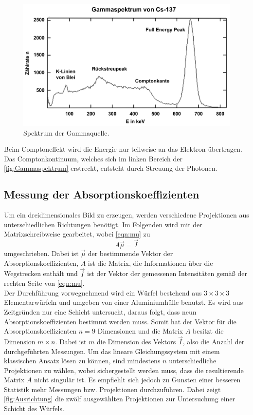 \begin{figure}[H]
    \centering
    \includegraphics[scale=0.7]{Abbildungen/Gammaspektrum.png}
    \caption{Spektrum der Gammaquelle.\cite{Gammaspektrum}}
    \label{fig:Gammaspektrum}
\end{figure}

Beim Comptoneffekt wird die Energie nur teilweise an das Elektron übertragen. Das Comptonkontinuum, welches sich im linken Bereich der
\autoref{fig:Gammaspektrum} erstreckt, entsteht durch Streuung der Photonen.

\subsection{Messung der Absorptionskoeffizienten}
\label{subsec:Absorptionskoeffizient}
Um ein dreidimensionales Bild zu erzeugen, werden verschiedene Projektionen aus unterschiedlichen Richtungen benötigt. Im Folgenden wird mit der Matrixschreibweise gearbeitet, wobei
\autoref{eqn:mu} zu
\begin{equation}
    A \vec{\mu} = \vec{I}
    \label{eqn:muMatrix}
\end{equation}
umgeschrieben. Dabei ist $\vec{\mu}$ der bestimmende Vektor der Absorptionskoeffizienten, $A$ ist die Matrix, die Informationen über die Wegstrecken enthält und $\vec{I}$ ist der Vektor 
der gemessenen Intensitäten gemäß der rechten Seite von \autoref{eqn:mu}.\\
Der Durchführung vorwegnehmend wird ein Würfel bestehend aus $3 \times 3 \times 3$ Elementarwürfeln und umgeben von einer Aluminiumhülle benutzt. Es wird aus Zeitgründen nur eine Schicht
untersucht, daraus folgt, dass neun Absorptionskoeffizienten bestimmt werden muss. Somit hat der Vektor für die Absorptionskoeffizienten $n = 9$ Dimensionen und die Matrix $A$ besitzt die 
Dimension $m \times n$. Dabei ist $m$ die Dimension des Vektors $\vec{I}$, also die Anzahl der durchgeführten Messungen. Um das lineare Gleichungssystem mit einem klassischen Ansatz lösen 
zu können, sind mindestens $n$ unterschiedliche Projektionen zu wählen, wobei sichergestellt werden muss, dass die resultierende Matrix $A$ nicht singulär ist. 
Es empfiehlt sich jedoch zu Gunsten einer besseren Statistik mehr Messungen bzw. Projektionen durchzuführen.
Dabei zeigt \autoref{fig:Ausrichtung} die zwölf ausgewählten Projektionen zur Untersuchung einer Schicht des Würfels.

